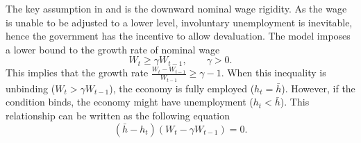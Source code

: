 The key assumption in \citet*{Schmitt-Uribe-16} and \citet{Na-18} is the downward nominal wage rigidity.
As the wage is unable to be adjusted to a lower level, involuntary unemployment is inevitable, hence the government has the incentive to allow devaluation. The model imposes a lower bound to the growth rate of nominal wage
\begin{equation}
    W_t \ge \gamma W_{t-1}, \qquad \gamma > 0.
\end{equation}
This implies that the growth rate $\frac{W_{t} - W_{t-1}}{W_{t-1}} \ge \gamma - 1$. When this inequality is unbinding ($W_t > \gamma W_{t-1}$), the economy is fully employed ($h_t = \bar{h}$). However, if the condition binds, the economy might have unemployment ($h_t < \bar{h}$). This relationship can be written as the following equation
\begin{equation}
    \label{eq:wage-rigid}
    (\bar{h} - h_t)(W_t - \gamma W_{t-1}) = 0.
\end{equation}
